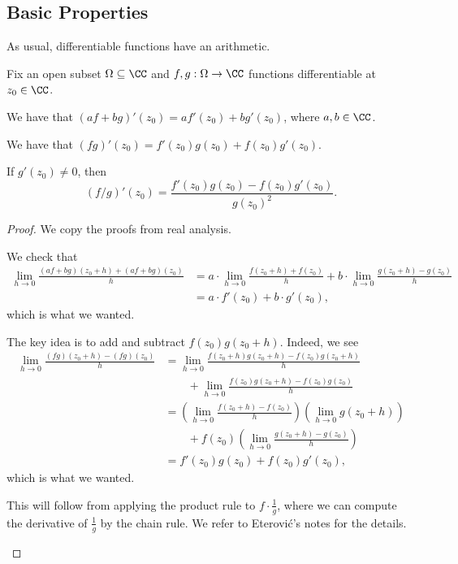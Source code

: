 \subsection{Basic Properties}
As usual, differentiable functions have an arithmetic.
\begin{proposition} \label{prop:computederivs}
	Fix an open subset $\Omega\subseteq\CC$ and $f,g:\Omega\to\CC$ functions differentiable at $z_0\in\CC$.
	\begin{listalph}
		\item We have that $(af+bg)'(z_0)=af'(z_0)+bg'(z_0)$, where $a,b\in\CC$.
		\item We have that $(fg)'(z_0)=f'(z_0)g(z_0)+f(z_0)g'(z_0)$.
		\item If $g'(z_0)\ne0$, then
		\[(f/g)'(z_0)=\frac{f'(z_0)g(z_0)-f(z_0)g'(z_0)}{g(z_0)^2}.\]
	\end{listalph}
\end{proposition}
\begin{proof}
	We copy the proofs from real analysis.
	\begin{listalph}
		\item We check that
		\begin{align*}
			\lim_{h\to0}\frac{(af+bg)(z_0+h)+(af+bg)(z_0)}h &= a\cdot\lim_{h\to0}\frac{f(z_0+h)+f(z_0)}h+b\cdot\lim_{h\to0}\frac{g(z_0+h)-g(z_0)}h \\
			&= a\cdot f'(z_0)+b\cdot g'(z_0),
		\end{align*}
		which is what we wanted.
		\item The key idea is to add and subtract $f(z_0)g(z_0+h)$. Indeed, we see
		\begin{align*}
			\lim_{h\to0}\frac{(fg)(z_0+h)-(fg)(z_0)}{h} &= \lim_{h\to0}\frac{f(z_0+h)g(z_0+h)-f(z_0)g(z_0+h)}{h} \\
			&\qquad+\lim_{h\to0}\frac{f(z_0)g(z_0+h)-f(z_0)g(z_0)}h \\
			&= \left(\lim_{h\to0}\frac{f(z_0+h)-f(z_0)}{h}\right)\left(\lim_{h\to0}g(z_0+h)\right) \\
			&\qquad+f(z_0)\left(\lim_{h\to0}\frac{g(z_0+h)-g(z_0)}h\right) \\
			&= f'(z_0)g(z_0)+f(z_0)g'(z_0),
		\end{align*}
		which is what we wanted.
		\item This will follow from applying the product rule to $f\cdot\frac1g$, where we can compute the derivative of $\frac1g$ by the chain rule. We refer to Eterovi\'c's notes for the details.
		\qedhere
	\end{listalph}
\end{proof}
